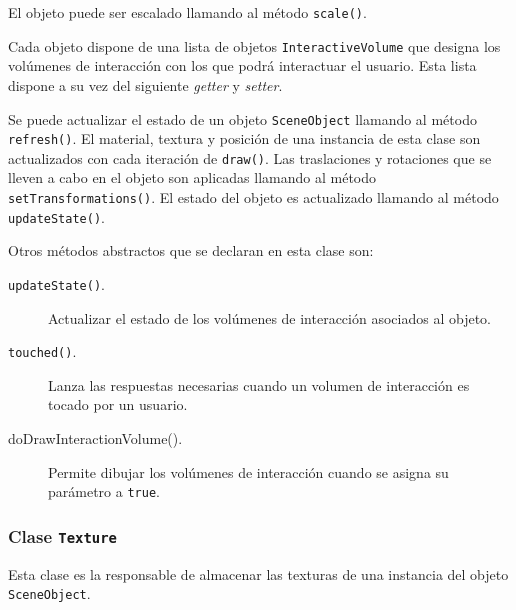 \documentclass[10pt,a4paper]{report}
\begin{document}
	
	
	El objeto puede ser escalado llamando al método \texttt{scale()}.
	
	
	
	Cada objeto dispone de una lista de objetos \texttt{InteractiveVolume} que designa los volúmenes de interacción con los que podrá interactuar el usuario. Esta lista dispone a su vez del siguiente \textit{getter} y \textit{setter}.
	
	
	
	Se puede actualizar el estado de un objeto \texttt{SceneObject} llamando al método \texttt{refresh()}. El material, textura y posición de una instancia de esta clase son actualizados con cada iteración de \texttt{draw()}. Las traslaciones y rotaciones que se lleven a cabo en el objeto son aplicadas llamando al método \texttt{setTransformations()}. El estado del objeto es actualizado llamando al método \texttt{updateState()}.
	
	
	
	Otros métodos abstractos que se declaran en esta clase son:
	\begin{description}
		\item[\texttt{updateState()}.] Actualizar el estado de los volúmenes de interacción asociados al objeto.
		\item[\texttt{touched()}.] Lanza las respuestas necesarias cuando un volumen de interacción es tocado por un usuario.
		\item[doDrawInteractionVolume().] Permite dibujar los volúmenes de interacción cuando se asigna su parámetro a \texttt{true}.
		\end{description}	
	
	 
	
	\subsubsection{Clase \texttt{Texture}}
	Esta clase es la responsable de almacenar las texturas de una instancia del objeto \texttt{SceneObject}.
	
	
	
\end{document}
